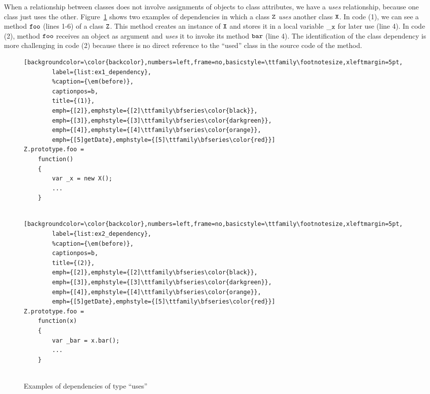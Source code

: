 \documentclass[review]{elsarticle}
\newcommand{\aspas}[1]{{``#1''}}
\newcommand{\mcode}[1]{$\tt #1$}
\begin{document}
When a relationship between classes does not involve assignments of objects to class attributes, we have a \textit{uses} relationship, because one class just uses the other. Figure~\ref{fig:example-dependencies} shows two examples of dependencies in which a class \mcode{Z} \textit{uses} another class \mcode{X}. In code (1), we can see a method \mcode{foo} (lines 1-6) of a class \mcode{Z}. This method creates an instance of \mcode{X} and stores it in a local variable \mcode{\_x} for later use (line 4). In code (2), method \mcode{foo} receives an object as argument and \textit{uses} it to invoke its method \mcode{bar} (line 4). The identification of the class dependency is more challenging in code (2) because there is no direct reference to the \aspas{used} class in the source code of the method. 

\begin{figure}[ht]
	\centering
	\begin{minipage}{.35\textwidth}
		\begin{lstlisting}[backgroundcolor=\color{backcolor},numbers=left,frame=no,basicstyle=\ttfamily\footnotesize,xleftmargin=5pt,
		label={list:ex1_dependency},
		%caption={\em(before)},
		captionpos=b,
		title={(1)},
		emph={[2]},emphstyle={[2]\ttfamily\bfseries\color{black}},
		emph={[3]},emphstyle={[3]\ttfamily\bfseries\color{darkgreen}},
		emph={[4]},emphstyle={[4]\ttfamily\bfseries\color{orange}},
		emph={[5]getDate},emphstyle={[5]\ttfamily\bfseries\color{red}}]
Z.prototype.foo = 
	function() 
	{
		var _x = new X();
		...
	}  
		
		\end{lstlisting}
	\end{minipage}
	\hspace{1pt}
	\begin{minipage}{.40\textwidth}
		\begin{lstlisting}[backgroundcolor=\color{backcolor},numbers=left,frame=no,basicstyle=\ttfamily\footnotesize,xleftmargin=5pt,
		label={list:ex2_dependency},
		%caption={\em(before)},
		captionpos=b,
		title={(2)},
		emph={[2]},emphstyle={[2]\ttfamily\bfseries\color{black}},
		emph={[3]},emphstyle={[3]\ttfamily\bfseries\color{darkgreen}},
		emph={[4]},emphstyle={[4]\ttfamily\bfseries\color{orange}},
		emph={[5]getDate},emphstyle={[5]\ttfamily\bfseries\color{red}}]
Z.prototype.foo = 
	function(x) 
	{
		var _bar = x.bar();
		...
	}
		
		\end{lstlisting}
	\end{minipage}
	
	\centering\caption{Examples of dependencies of type \aspas{uses}}
	\label{fig:example-dependencies}
\end{figure}
\end{document}
